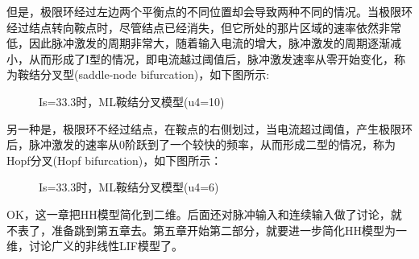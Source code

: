 \documentclass[12pt, a4paper, oneside]{ctexbook}
\begin{document}
但是，极限环经过左边两个平衡点的不同位置却会导致两种不同的情况。当极限环经过结点转向鞍点时，尽管结点已经消失，但它所处的那片区域的速率依然非常低，因此脉冲激发的周期非常大，随着输入电流的增大，脉冲激发的周期逐渐减小，从而形成了I型的情况，即电流越过阈值后，脉冲激发速率从零开始变化，称为鞍结分叉型(saddle-node bifurcation)，如下图所示:

\begin{figure}[H]
    \centering
    \caption{Is=33.3时，ML鞍结分叉模型(u4=10)}
\end{figure}

另一种是，极限环不经过结点，在鞍点的右侧划过，当电流超过阈值，产生极限环后，脉冲激发的速率从0阶跃到了一个较快的频率，从而形成二型的情况，称为Hopf分叉(Hopf bifurcation)，如下图所示：

\begin{figure}[H]
    \centering
    \caption{Is=33.3时，ML鞍结分叉模型(u4=6)}
\end{figure}

OK，这一章把HH模型简化到二维。后面还对脉冲输入和连续输入做了讨论，就不表了，准备跳到第五章去。第五章开始第二部分，就要进一步简化HH模型为一维，讨论广义的非线性LIF模型了。
\end{document}
